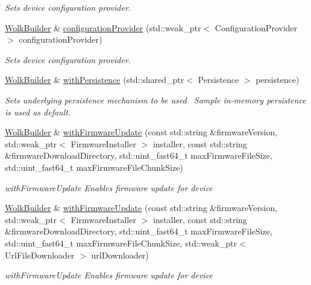 \begin{DoxyCompactItemize}
\begin{DoxyCompactList}\small\item\em Sets device configuration provider. \end{DoxyCompactList}\item 
\hyperlink{classwolkabout_1_1_wolk_builder}{Wolk\+Builder} \& \hyperlink{classwolkabout_1_1_wolk_builder_afb551712f0966a4bf6a6cb86e2c7f37b}{configuration\+Provider} (std\+::weak\+\_\+ptr$<$ Configuration\+Provider $>$ configuration\+Provider)
\begin{DoxyCompactList}\small\item\em Sets device configuration provider. \end{DoxyCompactList}\item 
\hyperlink{classwolkabout_1_1_wolk_builder}{Wolk\+Builder} \& \hyperlink{classwolkabout_1_1_wolk_builder_ab802dd28b9ad64d62b100ca475776446}{with\+Persistence} (std\+::shared\+\_\+ptr$<$ Persistence $>$ persistence)
\begin{DoxyCompactList}\small\item\em Sets underlying persistence mechanism to be used~\newline
 Sample in-\/memory persistence is used as default. \end{DoxyCompactList}\item 
\hyperlink{classwolkabout_1_1_wolk_builder}{Wolk\+Builder} \& \hyperlink{classwolkabout_1_1_wolk_builder_ae441661b8a61c4aaf8b7d9a794f0debc}{with\+Firmware\+Update} (const std\+::string \&firmware\+Version, std\+::weak\+\_\+ptr$<$ Firmware\+Installer $>$ installer, const std\+::string \&firmware\+Download\+Directory, std\+::uint\+\_\+fast64\+\_\+t max\+Firmware\+File\+Size, std\+::uint\+\_\+fast64\+\_\+t max\+Firmware\+File\+Chunk\+Size)
\begin{DoxyCompactList}\small\item\em with\+Firmware\+Update Enables firmware update for device \end{DoxyCompactList}\item 
\hyperlink{classwolkabout_1_1_wolk_builder}{Wolk\+Builder} \& \hyperlink{classwolkabout_1_1_wolk_builder_a72920612045d4ee812931320a13410c7}{with\+Firmware\+Update} (const std\+::string \&firmware\+Version, std\+::weak\+\_\+ptr$<$ Firmware\+Installer $>$ installer, const std\+::string \&firmware\+Download\+Directory, std\+::uint\+\_\+fast64\+\_\+t max\+Firmware\+File\+Size, std\+::uint\+\_\+fast64\+\_\+t max\+Firmware\+File\+Chunk\+Size, std\+::weak\+\_\+ptr$<$ Url\+File\+Downloader $>$ url\+Downloader)
\begin{DoxyCompactList}\small\item\em with\+Firmware\+Update Enables firmware update for device \end{DoxyCompactList}\item 

\end{DoxyCompactItemize}
